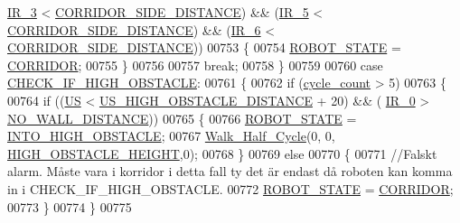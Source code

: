 \begin{DoxyCode}
      \hyperlink{state__machine_8c_a7831b71dc250258ecefe0e23f9920688}{IR\_3} < \hyperlink{state__machine_8c_a201d56046ddf552d57b4862e0ec07a10}{CORRIDOR\_SIDE\_DISTANCE}) && (\hyperlink{state__machine_8c_ad00ba6cc1cf461bda7059f5aafc06142}{IR\_5} < 
      \hyperlink{state__machine_8c_a201d56046ddf552d57b4862e0ec07a10}{CORRIDOR\_SIDE\_DISTANCE}) && (\hyperlink{state__machine_8c_a8c51bcd8b555e8c78fea79b88d28b55e}{IR\_6} < 
      \hyperlink{state__machine_8c_a201d56046ddf552d57b4862e0ec07a10}{CORRIDOR\_SIDE\_DISTANCE}))
00753             \{
00754                 \hyperlink{state__machine_8h_a5e5321a4a9085b83c8161454bf7a145c}{ROBOT\_STATE} = \hyperlink{state__machine_8h_a94b1da2e055fff4d143aa6aa891f79a9af4fc00ebf5a552ca632130e794617d58}{CORRIDOR};
00755             \}
00756             
00757             \textcolor{keywordflow}{break};
00758         \}
00759         
00760         \textcolor{keywordflow}{case} \hyperlink{state__machine_8h_a94b1da2e055fff4d143aa6aa891f79a9a557d0d4a66f1051ba446e525db38ea5d}{CHECK\_IF\_HIGH\_OBSTACLE}:
00761         \{
00762             \textcolor{keywordflow}{if} (\hyperlink{state__machine_8c_a937f74a65988b9e22241ab3765b82c50}{cycle\_count} > 5)
00763             \{
00764                 \textcolor{keywordflow}{if} ((\hyperlink{state__machine_8c_a6f9b7bcc44d43aac6b387f2aaacc3a18}{US} < \hyperlink{state__machine_8c_a647ce7a809da5ed12ea5319ed1c2b73f}{US\_HIGH\_OBSTACLE\_DISTANCE} + 20) && (
      \hyperlink{state__machine_8c_a7afcf874a71b2cde367dc9c28f5f01f1}{IR\_0} > \hyperlink{state__machine_8c_a9d981c215ebe94b6be6a0d49ccd2dce8}{NO\_WALL\_DISTANCE}))
00765                 \{
00766                     \hyperlink{state__machine_8h_a5e5321a4a9085b83c8161454bf7a145c}{ROBOT\_STATE} = \hyperlink{state__machine_8h_a94b1da2e055fff4d143aa6aa891f79a9a5720da833432aa3b68ff7e1a6529a7a6}{INTO\_HIGH\_OBSTACLE};
00767                     \hyperlink{gangstilar_8c_a8b22e9229a15d20adb676428ad7f6dac}{Walk\_Half\_Cycle}(0, 0, \hyperlink{state__machine_8c_a71306943edfdf6608e8ecb2b31b84b76}{HIGH\_OBSTACLE\_HEIGHT},0);
00768                 \}
00769                 \textcolor{keywordflow}{else}
00770                 \{
00771                     \textcolor{comment}{//Falskt alarm. Måste vara i korridor i detta fall ty det är endast då roboten kan
       komma in i CHECK\_IF\_HIGH\_OBSTACLE. }
00772                     \hyperlink{state__machine_8h_a5e5321a4a9085b83c8161454bf7a145c}{ROBOT\_STATE} = \hyperlink{state__machine_8h_a94b1da2e055fff4d143aa6aa891f79a9af4fc00ebf5a552ca632130e794617d58}{CORRIDOR}; 
00773                 \}
00774             \}
00775             

\end{DoxyCode}
